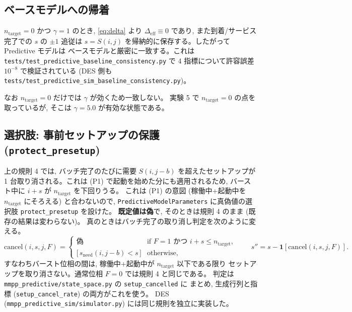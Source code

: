 \documentclass[a4paper,11pt]{article}
\newcommand{\code}[1]{\texttt{#1}}
\newcommand{\eff}{\mathrm{eff}}
\begin{document}
\subsection{ベースモデルへの帰着}

$n_{\mathrm{target}}=0$ かつ $\gamma=1$ のとき, \eqref{eq:delta} より
$\Delta_{\eff}\equiv0$ であり, また到着/サービス完了での $s$ の $\pm1$ 追従は
$s=S(i,j)$ を帰納的に保存する。したがって Predictive モデルは
ベースモデルと厳密に一致する。これは
\code{tests/test\_predictive\_baseline\_consistency.py} で
4 指標について許容誤差 $10^{-8}$ で検証されている
(DES 側も \code{tests/test\_predictive\_sim\_baseline\_consistency.py})。

なお $n_{\mathrm{target}}=0$ だけでは $\gamma$ が効くため一致しない。
実験 5 で $n_{\mathrm{target}}=0$ の点を取っているが, そこは
$\gamma=5.0$ が有効な状態である。

\subsection{選択肢: 事前セットアップの保護 (\code{protect\_presetup})}
\label{sec:protect}

上の規則 4 では, バッチ完了のたびに需要 $S(i,j-b)$ を超えたセットアップが
1 台取り消される。これは (P1) で起動を始めた分にも適用されるため,
バースト中に $i+s$ が $n_{\mathrm{target}}$ を下回りうる。
これは (P1) の意図 (稼働中+起動中を $n_{\mathrm{target}}$ にそろえる) と合わないので,
\code{PredictiveModelParameters} に真偽値の選択肢 \code{protect\_presetup} を設けた。
\textbf{既定値は偽}で, そのときは規則 4 のまま (既存の結果は変わらない)。
真のときはバッチ完了の取り消し判定を次のように変える。
\begin{equation}
  \mathrm{cancel}(i,s,j,F)=
  \begin{cases}
    \text{偽} & \text{if } F=1 \text{ かつ } i+s\le n_{\mathrm{target}},\\
    \bigl[\,s_{\mathrm{need}}(i,j-b)<s\,\bigr] & \text{otherwise,}
  \end{cases}
  \qquad s''=s-\mathbf{1}[\mathrm{cancel}(i,s,j,F)].
  \label{eq:protect}
\end{equation}
すなわちバースト位相の間は, 稼働中+起動中が $n_{\mathrm{target}}$ 以下である限り
セットアップを取り消さない。通常位相 $F=0$ では規則 4 と同じである。
判定は \code{mmpp\_predictive/state\_space.py} の \code{setup\_cancelled} に
まとめ, 生成行列と指標 (\code{setup\_cancel\_rate}) の両方がこれを使う。
DES (\code{mmpp\_predictive\_sim/simulator.py}) には同じ規則を独立に実装した。
\end{document}
